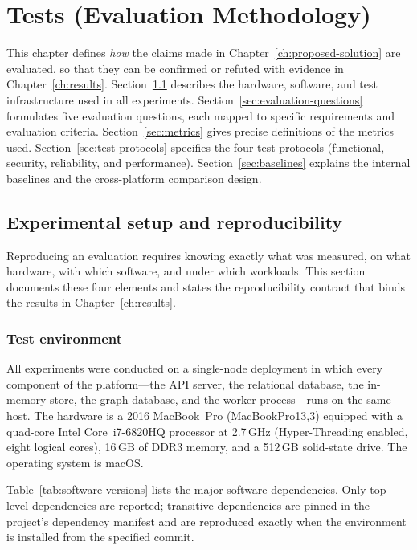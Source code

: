 \documentclass[a4paper]{sapthesis}
\begin{document}
\chapter{Tests (Evaluation Methodology)}
\label{ch:tests}

This chapter defines \emph{how} the claims made in
Chapter~\ref{ch:proposed-solution} are evaluated, so that they can be
confirmed or refuted with evidence in Chapter~\ref{ch:results}.
Section~\ref{sec:experimental-setup} describes the hardware, software, and
test infrastructure used in all experiments.
Section~\ref{sec:evaluation-questions} formulates five evaluation questions,
each mapped to specific requirements and evaluation criteria.
Section~\ref{sec:metrics} gives precise definitions of the metrics used.
Section~\ref{sec:test-protocols} specifies the four test protocols
(functional, security, reliability, and performance).
Section~\ref{sec:baselines} explains the internal baselines and the
cross-platform comparison design.

\section{Experimental setup and reproducibility}
\label{sec:experimental-setup}

Reproducing an evaluation requires knowing exactly what was measured, on
what hardware, with which software, and under which workloads.  This
section documents these four elements and states the reproducibility
contract that binds the results in Chapter~\ref{ch:results}.

\subsection{Test environment}

All experiments were conducted on a single-node deployment in which every
component of the platform---the API server, the relational database, the
in-memory store, the graph database, and the worker process---runs on the
same host.  The hardware is a 2016 MacBook~Pro (MacBookPro13,3) equipped
with a quad-core Intel Core~i7-6820HQ processor at 2.7\,GHz
(Hyper-Threading enabled, eight logical cores), 16\,GB of DDR3 memory,
and a 512\,GB solid-state drive.  The operating system is macOS.

Table~\ref{tab:software-versions} lists the major software dependencies.
Only top-level dependencies are reported; transitive dependencies are
pinned in the project's dependency manifest and are reproduced exactly
when the environment is installed from the specified commit.
\end{document}
